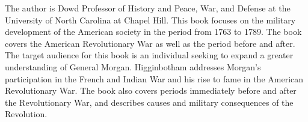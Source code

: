 The author is Dowd Professor of History and Peace, War, and Defense at the
University of North Carolina at Chapel Hill. This book focuses on the military
development of the American society in the period from 1763 to 1789. The book
covers the American Revolutionary War as well as the period before and after.
The target audience for this book is an individual seeking to expand a greater
understanding of General Morgan. Higginbotham addresses Morgan's participation
in the French and Indian War and his rise to fame in the American Revolutionary
War. The book also covers periods immediately before and after the Revolutionary
War, and describes causes and military consequences of the Revolution.


%


